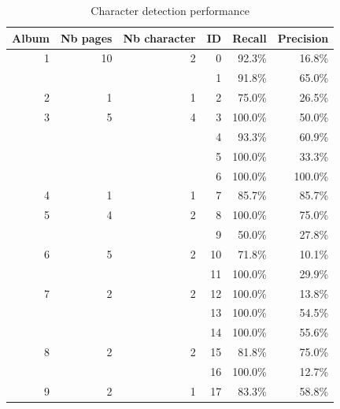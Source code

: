 \begin{table}[h]%
\centering
\caption{Character detection performance}
\begin{tabular}{|c|l|l|r|r|r|}
\hline
\multicolumn{1}{|c|}{\textbf{Album}} & \multicolumn{1}{c|}{\textbf{Nb pages}} & \multicolumn{1}{c|}{\textbf{Nb character}} & \multicolumn{1}{c|}{\textbf{ID}}  & \multicolumn{1}{c|}{\textbf{Recall}} & \multicolumn{1}{c|}{\textbf{Precision}} \\ \hline
\multicolumn{1}{|r|}{1}  & \multicolumn{1}{r|}{10} & \multicolumn{1}{r|}{2} & 0  & 92.3\% & 16.8\% \\ \hline
 &  &   & 1 & 91.8\% & 65.0\% \\ \hline
\multicolumn{1}{|r|}{2}  & \multicolumn{1}{r|}{1} & \multicolumn{1}{r|}{1} & 2  & 75.0\% & 26.5\% \\ \hline
\multicolumn{1}{|r|}{3}  & \multicolumn{1}{r|}{5} & \multicolumn{1}{r|}{4} & 3  & 100.0\% & 50.0\% \\ \hline
 &  &   & 4  & 93.3\% & 60.9\% \\ \hline
 &  &   & 5  & 100.0\% & 33.3\% \\ \hline
 &  &   & 6  & 100.0\% & 100.0\% \\ \hline
\multicolumn{1}{|r|}{4}  & \multicolumn{1}{r|}{1} & \multicolumn{1}{r|}{1} & 7  & 85.7\% & 85.7\% \\ \hline
\multicolumn{1}{|r|}{5}  & \multicolumn{1}{r|}{4} & \multicolumn{1}{r|}{2} & 8 & 100.0\% & 75.0\% \\ \hline
 &   &  & 9 & 50.0\% & 27.8\% \\ \hline
\multicolumn{1}{|r|}{6}  & \multicolumn{1}{r|}{5} & \multicolumn{1}{r|}{2} & 10 & 71.8\% & 10.1\% \\ \hline
 &   &  & 11  & 100.0\% & 29.9\% \\ \hline
\multicolumn{1}{|r|}{7}  & \multicolumn{1}{r|}{2} & \multicolumn{1}{r|}{2} & 12 & 100.0\% & 13.8\% \\ \hline
 &   &  & 13 & 100.0\%  & 54.5\% \\ \hline
 &   &  & 14 & 100.0\%  & 55.6\% \\ \hline
\multicolumn{1}{|r|}{8}  & \multicolumn{1}{r|}{2} & \multicolumn{1}{r|}{2} & 15 & 81.8\% & 75.0\% \\ \hline
 &   &  & 16 & 100.0\%  & 12.7\% \\ \hline
\multicolumn{1}{|r|}{9}  & \multicolumn{1}{r|}{2} & \multicolumn{1}{r|}{1} & 17 & 83.3\% & 58.8\% \\ \hline

\end{tabular}
\end{table}
